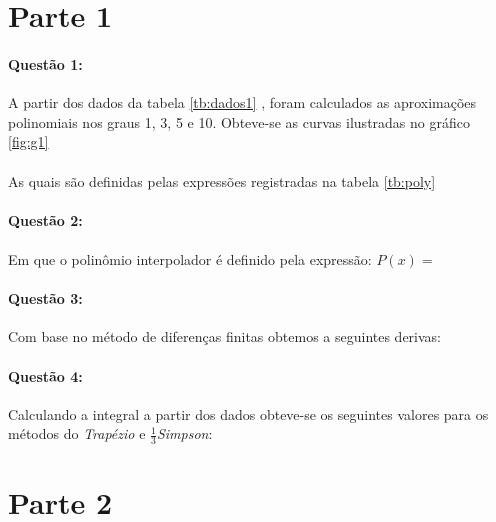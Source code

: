 \documentclass[a4paper,11pt]{article}
\title{\tituloCapa}
\begin{document}


\section{Parte 1}
\paragraph{Questão 1:}A partir dos dados da tabela \ref{tb:dados1} , foram calculados as aproximações polinomiais nos graus 1, 3, 5 e 10. Obteve-se as curvas ilustradas no gráfico \ref{fig:g1}
\paragraph{}As quais são definidas pelas expressões registradas na tabela \ref{tb:poly}


\paragraph{Questão 2:}
\paragraph{}Em que o polinômio interpolador é definido pela expressão:
{$P(x) =$\  \centering}

\paragraph{Questão 3:}Com base no método de diferenças finitas obtemos a seguintes derivas:

\paragraph{Questão 4:}Calculando a integral a partir dos dados obteve-se os seguintes valores para os métodos do \textit{Trapézio} e $\frac{1}{3}$\textit{Simpson}:
\section{Parte 2}
\end{document}
